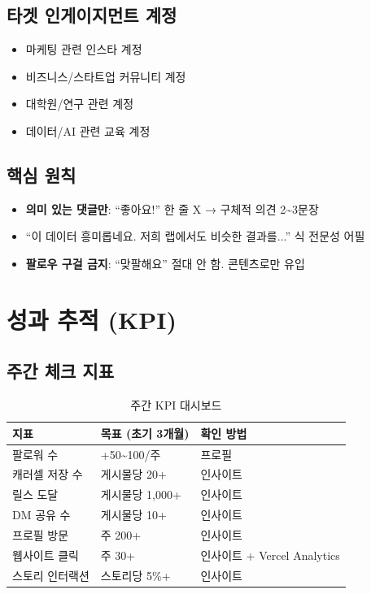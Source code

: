 \documentclass[11pt, a4paper]{article}
\begin{document}
\subsection{타겟 인게이지먼트 계정}
\begin{itemize}[leftmargin=2em]
  \item 마케팅 관련 인스타 계정
  \item 비즈니스/스타트업 커뮤니티 계정
  \item 대학원/연구 관련 계정
  \item 데이터/AI 관련 교육 계정
\end{itemize}

\subsection{핵심 원칙}
\begin{itemize}[leftmargin=2em]
  \item \textbf{의미 있는 댓글만}: ``좋아요!'' 한 줄 X → 구체적 의견 2\textasciitilde 3문장
  \item ``이 데이터 흥미롭네요. 저희 랩에서도 비슷한 결과를...'' 식 전문성 어필
  \item \textbf{팔로우 구걸 금지}: ``맞팔해요'' 절대 안 함. 콘텐츠로만 유입
\end{itemize}


\section{성과 추적 (KPI)}

\subsection{주간 체크 지표}

\begin{table}[h!]
\centering
\begin{tabularx}{\textwidth}{l l Y}
\toprule
\textbf{지표} & \textbf{목표 (초기 3개월)} & \textbf{확인 방법} \\
\midrule
팔로워 수 & +50\textasciitilde 100/주 & 프로필 \\
캐러셀 저장 수 & 게시물당 20+ & 인사이트 \\
릴스 도달 & 게시물당 1,000+ & 인사이트 \\
DM 공유 수 & 게시물당 10+ & 인사이트 \\
프로필 방문 & 주 200+ & 인사이트 \\
웹사이트 클릭 & 주 30+ & 인사이트 + Vercel Analytics \\
스토리 인터랙션 & 스토리당 5\%+ & 인사이트 \\
\bottomrule
\end{tabularx}
\caption{주간 KPI 대시보드}
\end{table}
\end{document}
